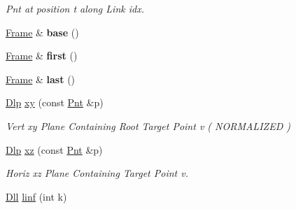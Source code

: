 \begin{DoxyCompactItemize}
\begin{DoxyCompactList}\small\item\em Pnt at position t along Link idx. \end{DoxyCompactList}\item 
\hypertarget{classvsr_1_1_chain_aeeb40ee3378f723e0376a65b387de52b}{\hyperlink{classvsr_1_1_frame}{Frame} \& {\bfseries base} ()}\label{classvsr_1_1_chain_aeeb40ee3378f723e0376a65b387de52b}

\item 
\hypertarget{classvsr_1_1_chain_ad1910f41ae48700097ebf3989b2becdb}{\hyperlink{classvsr_1_1_frame}{Frame} \& {\bfseries first} ()}\label{classvsr_1_1_chain_ad1910f41ae48700097ebf3989b2becdb}

\item 
\hypertarget{classvsr_1_1_chain_ab81428f975d4e561805705d170b998e2}{\hyperlink{classvsr_1_1_frame}{Frame} \& {\bfseries last} ()}\label{classvsr_1_1_chain_ab81428f975d4e561805705d170b998e2}

\item 
\hypertarget{classvsr_1_1_chain_ae361dbf21d5e311967aa4e6b805fe4a8}{\hyperlink{namespacevsr_ae6aa665e2777c681cdc7cab893be07d2}{Dlp} \hyperlink{classvsr_1_1_chain_ae361dbf21d5e311967aa4e6b805fe4a8}{xy} (const \hyperlink{namespacevsr_a2d05beb9721c5d9211b479af6d47222d}{Pnt} \&p)}\label{classvsr_1_1_chain_ae361dbf21d5e311967aa4e6b805fe4a8}

\begin{DoxyCompactList}\small\item\em Vert xy Plane Containing Root Target Point v ( N\-O\-R\-M\-A\-L\-I\-Z\-E\-D ) \end{DoxyCompactList}\item 
\hypertarget{classvsr_1_1_chain_a0be91e62f3b2fae2a7de3585f1924fc9}{\hyperlink{namespacevsr_ae6aa665e2777c681cdc7cab893be07d2}{Dlp} \hyperlink{classvsr_1_1_chain_a0be91e62f3b2fae2a7de3585f1924fc9}{xz} (const \hyperlink{namespacevsr_a2d05beb9721c5d9211b479af6d47222d}{Pnt} \&p)}\label{classvsr_1_1_chain_a0be91e62f3b2fae2a7de3585f1924fc9}

\begin{DoxyCompactList}\small\item\em Horiz xz Plane Containing Target Point v. \end{DoxyCompactList}\item 
\hypertarget{classvsr_1_1_chain_a4b751740fc3b778a689c97a962a7da0c}{\hyperlink{namespacevsr_a6c6892b7aec25cfb16492501e2e35b11}{Dll} \hyperlink{classvsr_1_1_chain_a4b751740fc3b778a689c97a962a7da0c}{linf} (int k)}\label{classvsr_1_1_chain_a4b751740fc3b778a689c97a962a7da0c}


\end{DoxyCompactItemize}
